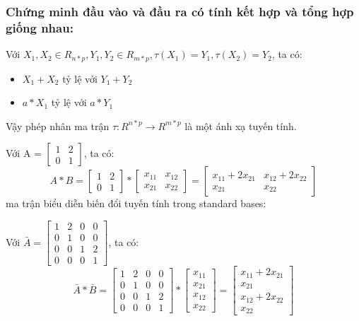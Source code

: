 \documentclass[a4paper,11pt]{article}
\theoremstyle{mytheor}
\begin{document}
\subsubsection*{Chứng minh đầu vào và đầu ra có tính kết hợp và tổng hợp giống nhau:}
Với $X_1,X_2 \in R_{n*p}, Y_1,Y_2 \in R_{m*p}, \tau(X_1) = Y_1, \tau(X_2) = Y_2$, ta có:
\begin{itemize}
    \item $X_1+X_2$ tỷ lệ với $Y_1+Y_2$
    \item $a*X_1$ tỷ lệ với $a*Y_1$
\end{itemize}
Vậy phép nhân ma trận $\tau: R^{n*p} \xrightarrow{} R^{m*p}$ là một ánh xạ tuyến tính.

Với A = $\begin{bmatrix}1&2\\0&1\end{bmatrix}$, ta có:
$$
    A*B = \begin{bmatrix}1&2\\0&1\end{bmatrix} * \begin{bmatrix}x_{1 1}&x_{1 2}\\x_{2 1}&x_{2 2}\end{bmatrix} = \begin{bmatrix}x_{1 1} + 2x_{2 1}&x_{1 2} + 2x_{2 2}\\x_{2 1}&x_{2 2}\end{bmatrix}
$$
ma trận biểu diễn biến đổi tuyến tính trong standard bases:

Với $\bar{A} = \begin{bmatrix}1&2&0&0\\0&1&0&0\\0&0&1&2\\0&0&0&1\end{bmatrix}$, ta có:
$$
    \bar{A}*\bar{B} = \begin{bmatrix}1&2&0&0\\0&1&0&0\\0&0&1&2\\0&0&0&1\end{bmatrix} * \begin{bmatrix}x_{1 1}\\x_{2 1}\\x_{1 2}\\x_{2 2}\end{bmatrix} = \begin{bmatrix}x_{1 1} + 2x_{2 1}\\x_{2 1}\\x_{1 2} + 2x_{2 2}\\x_{2 2}\end{bmatrix}
$$
\end{document}
